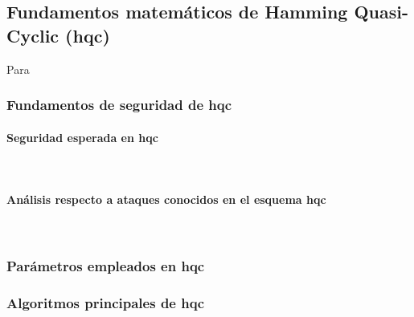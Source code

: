 \subsection{Fundamentos matemáticos de Hamming Quasi-Cyclic (\gls{hqc})}
Para  \cite{hqc-spec-2022}
\subsubsection{Fundamentos de seguridad de \gls{hqc}}
\paragraph{Seguridad esperada en \gls{hqc}}
\mbox{}\\
\paragraph{Análisis respecto a ataques conocidos en el esquema \gls{hqc}}
\mbox{}\\
\subsubsection{Parámetros empleados en \gls{hqc}}
\subsubsection{Algoritmos principales de \gls{hqc} \cite{hqc-spec-2022}}

